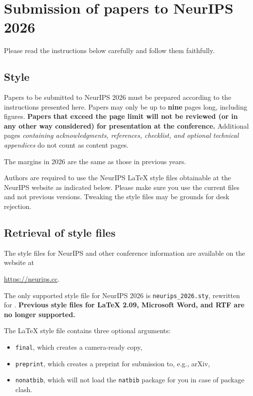\documentclass{article}
\begin{document}
\section{Submission of papers to NeurIPS 2026}


Please read the instructions below carefully and follow them faithfully.


\subsection{Style}


Papers to be submitted to NeurIPS 2026 must be prepared according to the
instructions presented here. Papers may only be up to {\bf nine} pages long, including figures. \textbf{Papers that exceed the page limit will not be reviewed (or in any other way considered) for presentation at the conference.}
Additional pages \emph{containing acknowledgments, references, checklist, and optional technical appendices} do not count as content pages. 


The margins in 2026 are the same as those in previous years.


Authors are required to use the NeurIPS \LaTeX{} style files obtainable at the NeurIPS website as indicated below. Please make sure you use the current files and not previous versions. Tweaking the style files may be grounds for desk rejection.


\subsection{Retrieval of style files}


The style files for NeurIPS and other conference information are available on the website at
\begin{center}
  \url{https://neurips.cc}.
\end{center}


The only supported style file for NeurIPS 2026 is \verb+neurips_2026.sty+, rewritten for \LaTeXe{}. \textbf{Previous style files for \LaTeX{} 2.09,  Microsoft Word, and RTF are no longer supported.}


The \LaTeX{} style file contains three optional arguments: 
\begin{itemize}
\item \verb+final+, which creates a camera-ready copy, 
\item \verb+preprint+, which creates a preprint for submission to, e.g., arXiv, \item \verb+nonatbib+, which will not load the \verb+natbib+ package for you in case of package clash.
\end{itemize}
\end{document}
